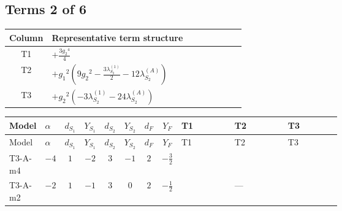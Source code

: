 \documentclass[8pt]{article}
\begin{document}
\begin{landscape}
\subsection*{Terms 2 of 6}
\begin{center}
\begin{tabular}{@{}c >{\raggedright\arraybackslash}p{0.82\linewidth}@{}}
\toprule
Column & Representative term structure \\
\midrule
T1 & \(\displaystyle +\frac{3 {g_2}^4}{4}\) \\
\midrule
T2 & \(\displaystyle +{g_1}^2 \left(9 {g_2}^2-\frac{3 {\lambda_{S_2}^{(1)}}}{2}-12 {\lambda_{S_2}^{(A)}}\right)\) \\
\midrule
T3 & \(\displaystyle +{g_2}^2 (-3 {\lambda_{S_2}^{(1)}}-24 {\lambda_{S_2}^{(A)}})\) \\
\midrule
\bottomrule
\end{tabular}
\end{center}
\smallskip
\tiny
\begin{longtable}{@{}llcccccc >{\raggedright\arraybackslash}p{0.21\linewidth} >{\raggedright\arraybackslash}p{0.21\linewidth} >{\raggedright\arraybackslash}p{0.21\linewidth}@{}}
\toprule
Model & $\alpha$ & $d_{S_1}$ & $Y_{S_1}$ & $d_{S_2}$ & $Y_{S_2}$ & $d_F$ & $Y_F$ & T1 & T2 & T3 \\
\midrule
\endfirsthead
\toprule
Model & $\alpha$ & $d_{S_1}$ & $Y_{S_1}$ & $d_{S_2}$ & $Y_{S_2}$ & $d_F$ & $Y_F$ & T1 & T2 & T3 \\
\midrule
\endhead
T3-A-m4 & $-4$ & $1$ & $-2$ & $3$ & $-1$ & $2$ & $-\frac{3}{2}$ & \scriptsize\adjustbox{max width=\linewidth}{$\begin{gathered} +\frac{3 {g_2}^4}{4}\end{gathered}$} & \scriptsize\adjustbox{max width=\linewidth}{$\begin{gathered} +{g_1}^2 \left(9 {g_2}^2-\frac{3 {\lambda_{S_2}^{(1)}}}{2}-12 {\lambda_{S_2}^{(A)}}\right)\end{gathered}$} & \scriptsize\adjustbox{max width=\linewidth}{$\begin{gathered} +{g_2}^2 (-3 {\lambda_{S_2}^{(1)}}-24 {\lambda_{S_2}^{(A)}})\end{gathered}$} \\
\midrule
T3-A-m2 & $-2$ & $1$ & $-1$ & $3$ & $0$ & $2$ & $-\frac{1}{2}$ & \scriptsize\adjustbox{max width=\linewidth}{$\begin{gathered} +\frac{3 {g_2}^4}{4}\end{gathered}$} & --- & \scriptsize\adjustbox{max width=\linewidth}{$\begin{gathered} +{g_2}^2 (-3 {\lambda_{S_2}^{(1)}}-24 {\lambda_{S_2}^{(A)}})\end{gathered}$} \\

\end{longtable}
\end{landscape}
\end{document}
